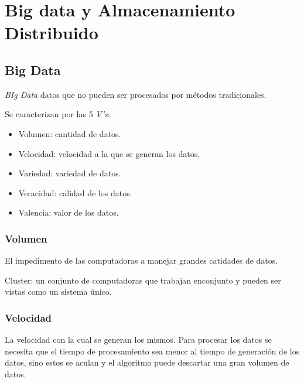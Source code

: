 \documentclass[../main.tex]{subfiles}
\begin{document}
\section{Big data y Almacenamiento Distribuido}
\subsection{Big Data}
    \textit{BIg Data} datos que no pueden ser procesados por métodos tradicionales. 
    
    Se caracterizan por las 5 \textit{V's}:
    \begin{itemize}
        \item Volumen: cantidad de datos.
        \item Velocidad: velocidad a la que se generan los datos.
        \item Variedad: variedad de datos.
        \item Veracidad: calidad de los datos.
        \item Valencia: valor de los datos.
    \end{itemize}

    \subsubsection{Volumen}
        El impedimento de las computadoras a manejar grandes catidades de datos.

        Cluster: un conjunto de computadoras que trabajan enconjunto y pueden ser vistas como un sistema único.

    \subsubsection{Velocidad}
        La velocidad con la cual se generan los mismos.
        Para procesar los datos se necesita que el tiempo de procesamiento sea menor al tiempo de generación de los datos, sino estos se aculan y el algoritmo puede descartar una gran volumen de datos.
\end{document}
